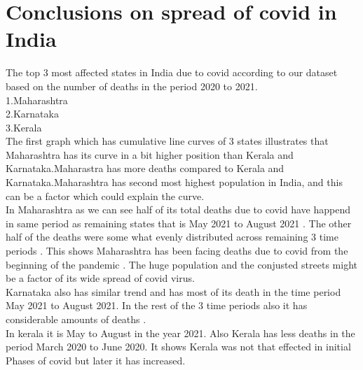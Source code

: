 \section{Conclusions on spread of covid in India}
The top 3 most affected states in India due to covid according to our dataset based on the number of deaths in the period 2020 to 2021.\\
1.Maharashtra\\
2.Karnataka\\
3.Kerala\\
The first graph which has cumulative line curves of 3 states illustrates that Maharashtra has its curve in a bit higher position than Kerala and Karnataka.Maharastra 
has more deaths compared to Kerala and Karnataka.Maharashtra has second most highest population in India, and this can be a factor which could explain the curve.\\

In Maharashtra as we can see half of its total deaths due to covid have happend in same period as remaining states that is May 2021 to August 2021 . The other half of the deaths were some what evenly distributed across remaining 3 time periods . This shows Maharashtra has been facing deaths due to covid from the beginning of the pandemic . The huge population and the conjusted streets might be a factor of its wide spread of covid virus.\\
Karnataka also has similar trend and has most of its death in the time period May 2021 to August 2021. In the rest of the 3 time periods also it has considerable amounts of deaths .\\
In kerala it is May to August in the year 2021. Also Kerala has less deaths in the period March 2020 to June 2020. It shows Kerala was not that effected in initial Phases of covid but later it has increased.\\



